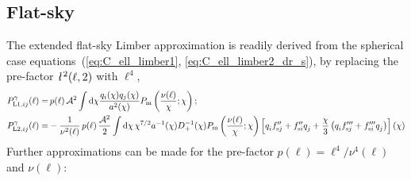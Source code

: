 \documentclass[fleqn,usenatbib]{mnras} %
\newcommand{\ellbar}{\hbox{\it \l}\,}
\newcommand{\pref}{{\cal A}}
\begin{document}

\subsection{Flat-sky}
\label{sec:Limber_flat_sky}

The extended flat-sky Limber approximation is readily derived from the
spherical case equations~(\ref{eq:C_ell_limber1}, \ref{eq:C_ell_limber2_dr_s}), by
replacing the pre-factor $\ellbar^2(\ell, 2)$ with $\ell^4$,
%
\begin{align}
  P^\gamma_{{\rm L1}, ij}(\ell) = & \, p(\ell) \, \pref^2 \int {\rm d} \chi \frac{ q_i(\chi) q_j(\chi) }{a^2(\chi)}
  P_{\rm m}\left(\frac{\nu(\ell)}{\chi}; \chi\right);
  \label{eq:P_ell_limber1}
  \\
    P^\gamma_{{\rm L2}, ij}(\ell) = & - \frac 1 {\nu^2(\ell)} \, p(\ell) \, \frac{\pref^2}{2}
    \int {\rm d} \chi \, \chi^{7/2} a^{-1}(\chi) D_+^{-1}(\chi) P_{\rm m}\left(\frac{\nu(\ell)}\chi; \chi\right)
    \left[ q^{}_i f^{\prime\prime}_{{\rm s}j} + f^{\prime\prime}_{{\rm s}i} q^{}_j  
      + \frac{\chi}{3} \left( q^{}_i f^{\prime\prime\prime}_{{\rm s}j} + f^{\prime\prime\prime}_{{\rm s}i} q^{}_j
      \right)
    \right](\chi)
  \label{eq:P_ell_limber2}
\end{align}
%
Further approximations can be made for the pre-factor $p(\ell) = \ell^4/\nu^4(\ell)$ and $\nu(\ell)$:
%
\end{document}
